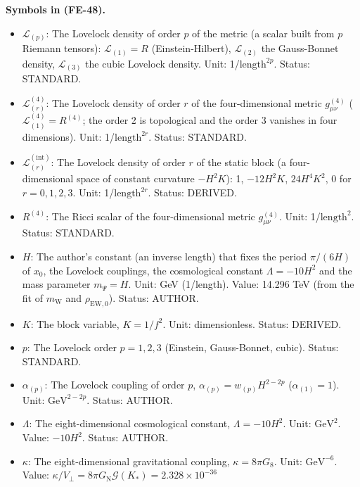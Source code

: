 \documentclass[
  10pt,
]{article}
\providecommand{\tightlist}{%
  \setlength{\itemsep}{0pt}\setlength{\parskip}{0pt}}
\begin{document}
\textbf{Symbols in (FE-48).}

\begin{itemize}
\tightlist
\item
  \(\mathcal{L}_{(p)}\): The Lovelock density of order \(p\) of the
  metric (a scalar built from \(p\) Riemann tensors):
  \(\mathcal{L}_{(1)} = R\) (Einstein-Hilbert), \(\mathcal{L}_{(2)}\)
  the Gauss-Bonnet density, \(\mathcal{L}_{(3)}\) the cubic Lovelock
  density. Unit: 1/\(\mathrm{length}^{2p}\). Status: STANDARD.
\item
  \(\mathcal{L}^{(4)}_{(r)}\): The Lovelock density of order \(r\) of
  the four-dimensional metric \(g^{(4)}_{\mu\nu}\)
  (\(\mathcal{L}^{(4)}_{(1)} = R^{(4)}\); the order 2 is topological and
  the order 3 vanishes in four dimensions). Unit:
  1/\(\mathrm{length}^{2r}\). Status: STANDARD.
\item
  \(\mathcal{L}^{(\mathrm{int})}_{(r)}\): The Lovelock density of order
  \(r\) of the static block (a four-dimensional space of constant
  curvature \(-H^2K\)): 1, \(-12H^2K\), \(24H^4K^2\), 0 for
  \(r = 0, 1, 2, 3\). Unit: 1/\(\mathrm{length}^{2r}\). Status: DERIVED.
\item
  \(R^{(4)}\): The Ricci scalar of the four-dimensional metric
  \(g^{(4)}_{\mu\nu}\). Unit: 1/\(\mathrm{length}^{2}\). Status:
  STANDARD.
\item
  \(H\): The author's constant (an inverse length) that fixes the period
  \(\pi/(6H)\) of \(x_0\), the Lovelock couplings, the cosmological
  constant \(\Lambda = -10H^2\) and the mass parameter \(m_\Psi = H\).
  Unit: GeV (1/length). Value: 14.296 TeV (from the fit of
  \(m_{\mathrm{W}}\) and \(\rho_{\mathrm{EW},0}\)). Status: AUTHOR.
\item
  \(K\): The block variable, \(K = 1/f^2\). Unit: dimensionless. Status:
  DERIVED.
\item
  \(p\): The Lovelock order \(p = 1, 2, 3\) (Einstein, Gauss-Bonnet,
  cubic). Status: STANDARD.
\item
  \(\alpha_{(p)}\): The Lovelock coupling of order \(p\),
  \(\alpha_{(p)} = w_{(p)}H^{2-2p}\) (\(\alpha_{(1)} = 1\)). Unit:
  \(\mathrm{GeV}^{2-2p}\). Status: AUTHOR.
\item
  \(\Lambda\): The eight-dimensional cosmological constant,
  \(\Lambda = -10H^2\). Unit: \(\mathrm{GeV}^{2}\). Value: \(-10H^2\).
  Status: AUTHOR.
\item
  \(\kappa\): The eight-dimensional gravitational coupling,
  \(\kappa = 8\pi G_8\). Unit: \(\mathrm{GeV}^{-6}\). Value:
  \(\kappa/V_\perp = 8\pi G_{\mathrm{N}}\mathcal{G}(K_*) = 2.328\times10^{-36}\)

\end{itemize}
\end{document}
